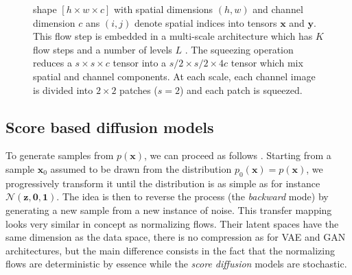 \documentclass[11pt]{amsart}
\begin{document}
\begin{figure}
{shape $[h \times w \times c]$ with spatial dimensions $(h, w)$ and channel dimension $c$ ans $(i, j)$ denote
spatial indices into tensors $\bm{x}$ and $\bm{y}$.  This flow step is embedded in a multi-scale  architecture which has $K$ flow steps and a number of levels $L$ \citep{2016arXiv160508803D}. The squeezing operation reduces a $s \times s \times c$ tensor  into a $s/2\times s/2 \times 4c$ tensor which mix spatial and channel components. At each scale, each channel image is divided into $2\times 2$ patches ($s=2$) and each patch is squeezed. }
    \label{fig-Glow-archi}
\end{figure}
\subsection{Score based diffusion models}
\label{sec-diff}
%
To generate samples from $p(\bm{x})$, we can proceed as follows \citep[e.g][]{Chang2023,LinYang2023}. Starting from a sample $\bm{x}_0$ assumed to be drawn from the distribution $p_0(\bm{x})=p(\bm{x})$, we progressively transform it until the  distribution is as simple as for instance $\mathcal{N}(\bm{z},\bm{0},\bm{1})$.  The idea is then to reverse the process (the \textit{backward} mode) by generating a new sample from a new instance of noise. This transfer mapping looks very similar in concept as normalizing flows. Their latent spaces have the same dimension as the data space, there is no compression as for VAE and GAN architectures, but the main difference consists in the fact that the normalizing flows are deterministic by essence while the \textit{score diffusion} models are stochastic. 
\end{document}
